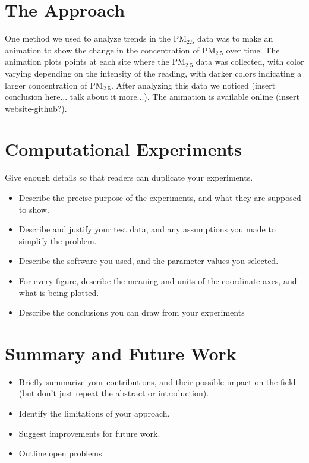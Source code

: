 \documentclass[10pt]{article}
\begin{document}
\section{The Approach}

One method we used to analyze trends in the PM$_{2.5}$ data was to make an animation to show the change in the concentration of PM$_{2.5}$  over time. The animation plots points at each site where the PM$_{2.5}$ data was collected, with color varying depending on the intensity of the reading, with darker colors indicating a larger concentration of PM$_{2.5}$. After analyzing this data we noticed (insert conclusion here... talk about it more...). The animation is available online (insert website-github?).


\section{Computational Experiments}
Give enough details so that readers can duplicate your experiments.

\begin{itemize}
\item Describe the precise purpose of the experiments, and what they 
are supposed to show.

\item Describe and justify your test data, and any assumptions you made to 
simplify the problem.

\item Describe the software you used, and the 
parameter values you selected.

\item 
For every figure, describe the meaning and units of the coordinate axes, 
and what is being plotted.

\item Describe the conclusions you can draw from your experiments
\end{itemize}

\section{Summary and Future Work}
\begin{itemize}
\item Briefly summarize your contributions, and their possible
impact on the field (but don't just repeat the abstract or introduction).
\item Identify the limitations of your approach.
\item Suggest improvements for future work.
\item Outline open problems.
\end{itemize}
\end{document}
